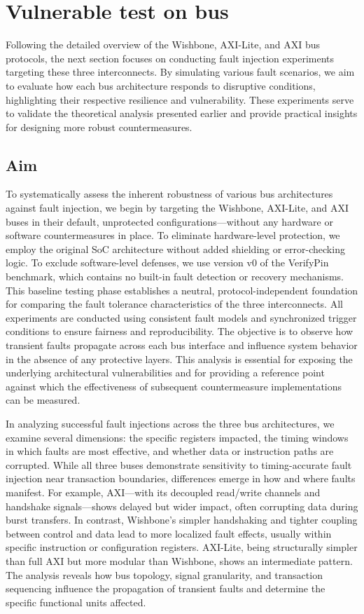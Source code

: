 \section{Vulnerable test on bus}

Following the detailed overview of the Wishbone, AXI-Lite, and AXI bus protocols, the next section focuses on conducting fault injection experiments targeting these three interconnects. By simulating various fault scenarios, we aim to evaluate how each bus architecture responds to disruptive conditions, highlighting their respective resilience and vulnerability. These experiments serve to validate the theoretical analysis presented earlier and provide practical insights for designing more robust countermeasures.

\subsection{Aim}

To systematically assess the inherent robustness of various bus architectures against fault injection, we begin by targeting the Wishbone, AXI-Lite, and AXI buses in their default, unprotected configurations—without any hardware or software countermeasures in place. To eliminate hardware-level protection, we employ the original SoC architecture without added shielding or error-checking logic. To exclude software-level defenses, we use version v0 of the VerifyPin benchmark, which contains no built-in fault detection or recovery mechanisms. This baseline testing phase establishes a neutral, protocol-independent foundation for comparing the fault tolerance characteristics of the three interconnects. All experiments are conducted using consistent fault models and synchronized trigger conditions to ensure fairness and reproducibility. The objective is to observe how transient faults propagate across each bus interface and influence system behavior in the absence of any protective layers. This analysis is essential for exposing the underlying architectural vulnerabilities and for providing a reference point against which the effectiveness of subsequent countermeasure implementations can be measured.

In analyzing successful fault injections across the three bus architectures, we examine several dimensions: the specific registers impacted, the timing windows in which faults are most effective, and whether data or instruction paths are corrupted. While all three buses demonstrate sensitivity to timing-accurate fault injection near transaction boundaries, differences emerge in how and where faults manifest. For example, AXI—with its decoupled read/write channels and handshake signals—shows delayed but wider impact, often corrupting data during burst transfers. In contrast, Wishbone's simpler handshaking and tighter coupling between control and data lead to more localized fault effects, usually within specific instruction or configuration registers. AXI-Lite, being structurally simpler than full AXI but more modular than Wishbone, shows an intermediate pattern. The analysis reveals how bus topology, signal granularity, and transaction sequencing influence the propagation of transient faults and determine the specific functional units affected.

